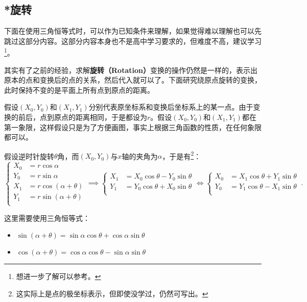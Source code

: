 \subsection{*旋转}\label{sub_FunTra_3}


下面在使用三角恒等式时，可以作为已知条件来理解，如果觉得难以理解也可以先跳过这部分内容。这部分内容本身也不是高中学习要求的，但难度不高，建议学习\footnote{想进一步了解可以参考。}。

其实有了之前的经验，求解\textbf{旋转（Rotation）}变换的操作仍然是一样的，表示出原本的点和变换后的点的关系，然后代入就可以了。下面研究绕原点旋转的变换，此时保持不变的是平面上所有点到原点的距离。

假设$(X_0,Y_0)$和$(X_1,Y_1)$分别代表原坐标系和变换后坐标系上的某一点。由于变换的前后，点到原点的距离相同，于是都设为$r$。假设$(X_0,Y_0)$和$(X_1,Y_1)$都在第一象限，这样假设只是为了方便画图，事实上根据三角函数的性质，在任何象限都可以。


假设逆时针旋转$\theta$角，而$(X_0,Y_0)$与$x$轴的夹角为$\alpha$，于是有\footnote{这实际上是点的极坐标表示，但即使没学过，仍然可写出。}：
\begin{equation}
\begin{cases}
X_0&=r\cos\alpha\\
Y_0&=r\sin\alpha\\
X_1&=r\cos(\alpha+\theta)\\
Y_1&=r\sin(\alpha+\theta)\\
\end{cases}\implies
\begin{cases}
X_1&=X_0 \cos \theta - Y_0 \sin \theta\\
Y_1&=Y_0 \cos \theta + X_0 \sin \theta\\
\end{cases}\iff
\begin{cases}
X_0&=X_1 \cos \theta + Y_1 \sin \theta\\
Y_0&=Y_1 \cos \theta - X_1 \sin \theta\\
\end{cases}~.
\end{equation}

这里需要使用三角恒等式：
\begin{itemize}
\item $\sin(\alpha + \theta)= \sin \alpha \cos \theta + \cos \alpha \sin \theta$
\item $\cos(\alpha + \theta)=\cos \alpha \cos \theta - \sin \alpha \sin \theta$
\end{itemize}

